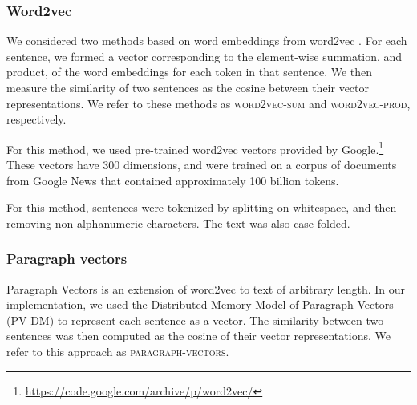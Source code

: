 \documentclass[11pt,letterpaper]{article}
\newcommand{\wordvecsum}{\textsc{word2vec-sum}\xspace}
\newcommand{\wordvecprod}{\textsc{word2vec-prod}\xspace}
\newcommand{\parvec}{\textsc{paragraph-vectors}\xspace}
\begin{document}



\subsubsection{Word2vec}

We considered two methods based on word embeddings from word2vec
\citep{Mikolov+:2013a}. For each sentence, we formed a vector
corresponding to the element-wise summation, and product, of the word
embeddings for each token in that sentence. We then measure the
similarity of two sentences as the cosine between their vector
representations. We refer to these methods as \wordvecsum and
\wordvecprod, respectively.

For this method, we used pre-trained word2vec vectors provided by
Google.\footnote{\url{https://code.google.com/archive/p/word2vec/}}
These vectors have 300 dimensions, and were trained on a corpus of
documents from Google News that contained approximately 100 billion
tokens.

For this method, sentences were tokenized by splitting on whitespace,
and then removing non-alphanumeric characters. The text was also
case-folded.


\subsubsection{Paragraph vectors}

Paragraph Vectors \citep{Le:Mikolov:2014} is an extension of word2vec
\citep{Mikolov+:2013a} to text of arbitrary length. In our
implementation, we used the Distributed Memory Model of Paragraph
Vectors (PV-DM) to represent each sentence as a vector. The similarity
between two sentences was then computed as the cosine of their vector
representations. We refer to this approach as \parvec.

\end{document}
